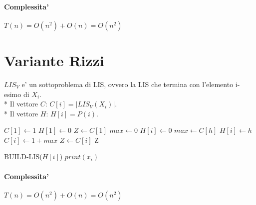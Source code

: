 \paragraph{Complessita'}
$T(n) = O(n^2) + O(n) = O(n^2)$

\newpage

\section{Variante Rizzi}

$LIS_V$ e' un sottoproblema di LIS, ovvero la LIS che termina con l'elemento i-esimo di $X_i$. \\*
Il vettore $C$: $C[i] = |LIS_V(X_i)|$. \\*
Il vettore $H$: $H[i] = P(i)$. \\

\begin{algorithm}
    \begin{algorithmic}
            \State $C[1] \gets 1$
            \State $H[1] \gets 0$
            \State $Z \gets C[1]$
                \State $max \gets 0$
                \State $H[i] \gets 0$
                        \State $max \gets C[h]$
                        \State $H[i] \gets h$
                    \EndIf
                \EndFor
                \State $C[i] \gets 1 + max$
                    \State $Z \gets C[i]$
                \EndIf
            \EndFor
            \State \Return Z
        \EndProcedure
    \end{algorithmic}
\end{algorithm}

\begin{algorithm}
    \begin{algorithmic}
                \State BUILD-LIS($H[i]$)
            \EndIf
            \State $print(x_i)$
        \EndProcedure
    \end{algorithmic}
\end{algorithm}

\paragraph{Complessita'}
$T(n) = O(n^2) + O(n) = O(n^2)$